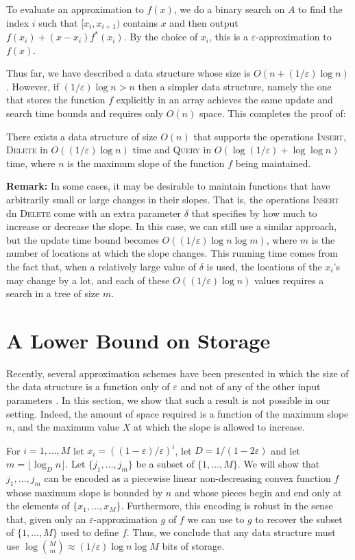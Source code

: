 \documentclass[charterfonts,lotsofwhite]{patmorin}
\newcommand{\eps}{\varepsilon}
\begin{document}
To evaluate an approximation to $f(x)$, we do a binary search on $A$
to find the index $i$ such that $[x_i,x_{i+1})$ contains $x$ and then
output $f(x_i) + (x-x_i)f^*(x_i)$.  By the choice of $x_i$, this is a
$\eps$-approximation to $f(x)$. 

Thus far, we have described a data structure whose size is
$O(n+(1/\eps)\log n)$.  However, if $(1/\eps)\log n > n$ then a
simpler data structure, namely the one that stores the function $f$
explicitly in an array achieves the same update  and search time
bounds and requires only $O(n)$ space.  This completes the proof of:

\begin{thm}
There exists a data structure of size $O(n)$ that supports the
operations \textsc{Insert}, \textsc{Delete} in $O((1/\eps) \log n)$
time and \textsc{Query} in $O(\log (1/\eps) + \log \log n)$ time,
where $n$ is the maximum slope of the function $f$ being maintained.
\end{thm}

\noindent\textbf{Remark:} In some cases, it may be desirable to
maintain functions that have arbitrarily small or large changes in
their slopes.  That is, the operations \textsc{Insert} dn
\textsc{Delete} come with an extra parameter $\delta$ that specifies
by how much to increase or decrease the slope.  In this case, we can
still use a similar approach, but the update time bound becomes
$O((1/\eps)\log n\log m)$, where $m$ is the number of locations at
which the slope changes.  This running time comes from the fact that,
when a relatively large value of $\delta$ is used, the locations of
the $x_i$'s may change by a lot, and each of these $O((1/\eps)\log n)$
values requires a search in a tree of size $m$.



\section{A Lower Bound on Storage}

Recently, several approximation schemes have been presented in which
the size of the data structure is a function only of $\eps$ and not of
any of the other input parameters \cite{ah01,i01,k97}.  In this
section, we show that such a result is not possible in our setting.
Indeed, the amount of space required is a function of the maximum
slope $n$, and the maximum value $X$ at which the slope is allowed to
increase.

For $i=1,\ldots,M$ let $x_i=((1-\eps)/\eps)^i$, let $D=1/(1-2\eps)$ and let
$m=\lfloor\log_D n\rfloor$.  Let $\{j_1,\ldots,j_m\}$ be a subset of
$\{1,\ldots,M\}$.  We will show that $j_1,\ldots,j_m$ can be encoded
as a piecewise linear non-decreasing convex function $f$ whose maximum
slope is bounded by $n$ and whose pieces begin and end only at the
elements of $\{x_1,\ldots,x_M\}$.  Furthermore, this encoding is
robust in the sense that, given only an $\eps$-approximation $g$
of $f$ we can use to $g$ to recover the subset of $\{1,\ldots,M\}$
used to define $f$.  Thus, we conclude that any data structure
must use $\log {M\choose m}\approx (1/\eps)\log n\log M$ bits of
storage. 
\end{document}
